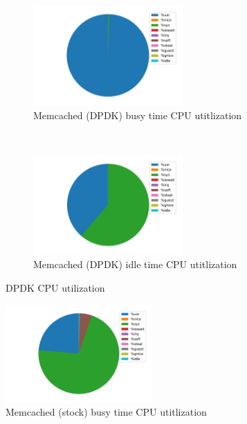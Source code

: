 \documentclass[bsc,frontabs,twoside,singlespacing,parskip,deptreport]{infthesis}     %
\begin{document}
\begin{figure}[t!]
    \centering
    \begin{subfigure}[t]{0.5\textwidth}
    	\includegraphics[height=1.5in]{figure/dpdk_busy_pie.pdf}
    	\caption{Memcached (DPDK) busy time CPU utitlization }
		\label{fig:dpdk_busy_pie}
		
    \end{subfigure}%
    ~ 
    \begin{subfigure}[t]{0.5\textwidth}
        \includegraphics[height=1.5in]{figure/dpdk_idle_pie.pdf}
        \caption{Memcached (DPDK) idle time CPU utitlization}
		\label{fig:dpdk_idle_pie}
        
		
    \end{subfigure}
    \caption{DPDK CPU utilization}
\end{figure}





\begin{figure}
	\centering
	\includegraphics[width=0.5\textwidth]{figure/mem_busy_pie.pdf}
	\caption{Memcached (stock) busy time CPU utitlization}
	\label{fig:dpdk_idle_pie_1}
\end{figure}
\end{document}
